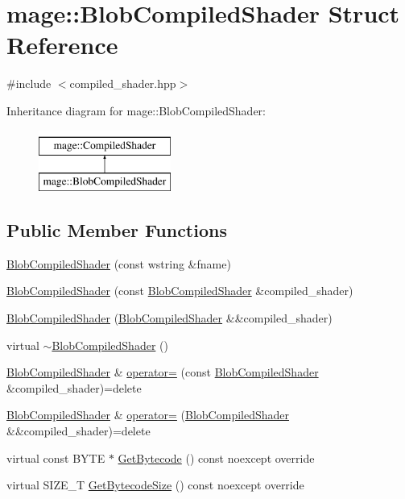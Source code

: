 \hypertarget{structmage_1_1_blob_compiled_shader}{}\section{mage\+:\+:Blob\+Compiled\+Shader Struct Reference}
\label{structmage_1_1_blob_compiled_shader}


{\ttfamily \#include $<$compiled\+\_\+shader.\+hpp$>$}

Inheritance diagram for mage\+:\+:Blob\+Compiled\+Shader\+:\begin{figure}[H]
\begin{center}
\leavevmode
\includegraphics[height=2.000000cm]{structmage_1_1_blob_compiled_shader}
\end{center}
\end{figure}
\subsection*{Public Member Functions}
\begin{DoxyCompactItemize}
\item 
\hyperlink{structmage_1_1_blob_compiled_shader_a5bfb0954f48720eba4610816636ad1cb}{Blob\+Compiled\+Shader} (const wstring \&fname)
\item 
\hyperlink{structmage_1_1_blob_compiled_shader_af7001d0e9c9a95f7ac9b9cc009bc1e94}{Blob\+Compiled\+Shader} (const \hyperlink{structmage_1_1_blob_compiled_shader}{Blob\+Compiled\+Shader} \&compiled\+\_\+shader)
\item 
\hyperlink{structmage_1_1_blob_compiled_shader_a41e4b17557dd1d6172fd6afcb97fdd79}{Blob\+Compiled\+Shader} (\hyperlink{structmage_1_1_blob_compiled_shader}{Blob\+Compiled\+Shader} \&\&compiled\+\_\+shader)
\item 
virtual \hyperlink{structmage_1_1_blob_compiled_shader_a75f98c42b9a17980146b7308080394a5}{$\sim$\+Blob\+Compiled\+Shader} ()
\item 
\hyperlink{structmage_1_1_blob_compiled_shader}{Blob\+Compiled\+Shader} \& \hyperlink{structmage_1_1_blob_compiled_shader_a631f7c06a43c7877cd9ce1a32ed8740d}{operator=} (const \hyperlink{structmage_1_1_blob_compiled_shader}{Blob\+Compiled\+Shader} \&compiled\+\_\+shader)=delete
\item 
\hyperlink{structmage_1_1_blob_compiled_shader}{Blob\+Compiled\+Shader} \& \hyperlink{structmage_1_1_blob_compiled_shader_ae0ee5b9e147511cd3e74a5c89300c55d}{operator=} (\hyperlink{structmage_1_1_blob_compiled_shader}{Blob\+Compiled\+Shader} \&\&compiled\+\_\+shader)=delete
\item 
virtual const B\+Y\+TE $\ast$ \hyperlink{structmage_1_1_blob_compiled_shader_a44cc21b9ab038c57155e64e8ced4d504}{Get\+Bytecode} () const noexcept override
\item 
virtual S\+I\+Z\+E\+\_\+T \hyperlink{structmage_1_1_blob_compiled_shader_a685f2a4aac87aa785c22940075eb23ec}{Get\+Bytecode\+Size} () const noexcept override
\end{DoxyCompactItemize}
